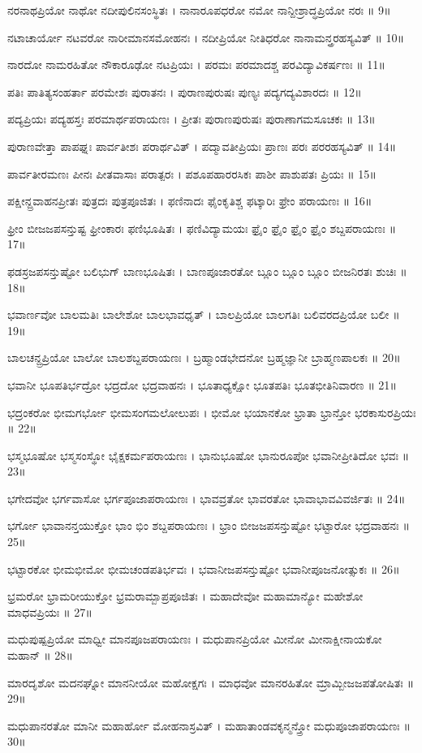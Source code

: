 ನರನಾಥಪ್ರಿಯೋ ನಾಥೋ ನದೀಪುಲಿನಸಂಸ್ಥಿತಃ ।
ನಾನಾರೂಪಧರೋ ನಮೋ ನಾನ್ದೀಶ್ರಾದ್ಧಪ್ರಿಯೋ ನರಃ ॥ 9॥

ನಟಾಚಾರ್ಯೋ ನಟವರೋ ನಾರೀಮಾನಸಮೋಹನಃ ।
ನದೀಪ್ರಿಯೋ ನೀತಿಧರೋ ನಾನಾಮನ್ತ್ರರಹಸ್ಯವಿತ್ ॥ 10॥

ನಾರದೋ ನಾಮರಹಿತೋ ನೌಕಾರೂಢೋ ನಟಪ್ರಿಯಃ ।
ಪರಮಃ ಪರಮಾದಶ್ಚ ಪರವಿದ್ಯಾವಿಕರ್ಷಣಃ ॥ 11॥

ಪತಿಃ ಪಾತಿತ್ಯಸಂಹರ್ತಾ ಪರಮೇಶಃ ಪುರಾತನಃ ।
ಪುರಾಣಪುರುಷಃ ಪುಣ್ಯಃ ಪದ್ಯಗದ್ಯವಿಶಾರದಃ ॥ 12॥

ಪದ್ಯಪ್ರಿಯಃ ಪದ್ಯಹಸ್ತಃ ಪರಮಾರ್ಥಪರಾಯಣಃ ।
ಪ್ರೀತಃ ಪುರಾಣಪುರುಷಃ ಪುರಾಣಾಗಮಸೂಚಕಃ ॥ 13॥

ಪುರಾಣವೇತ್ತಾ ಪಾಪಘ್ನಃ ಪಾರ್ವತೀಶಃ ಪರಾರ್ಥವಿತ್ ।
ಪದ್ಮಾವತೀಪ್ರಿಯಃ ಪ್ರಾಣಃ ಪರಃ ಪರರಹಸ್ಯವಿತ್ ॥ 14॥

ಪಾರ್ವತೀರಮಣಃ ಪೀನಃ ಪೀತವಾಸಾಃ ಪರಾತ್ಪರಃ ।
ಪಶೂಪಹಾರರಸಿಕಃ ಪಾಶೀ ಪಾಶುಪತಃ ಪ್ರಿಯಃ ॥ 15॥

ಪಕ್ಷೀನ್ದ್ರವಾಹನಪ್ರೀತಃ ಪುತ್ರದಃ ಪುತ್ರಪೂಜಿತಃ ।
ಫಣಿನಾದಃ ಫೈಂಕೃತಿಶ್ಚ ಫಟ್ಕಾರಿಃ ಫ್ರೇಂ ಪರಾಯಣಃ ॥ 16॥

ಫ್ರೀಂ ಬೀಜಜಪಸನ್ತುಷ್ಟ ಫ್ರೀಂಕಾರಃ ಫಣಿಭೂಷಿತಃ ।
ಫಣಿವಿದ್ಯಾಮಯಃ ಫ್ರೈಂ ಫ್ರೈಂ ಫ್ರೈಂ ಫ್ರೈಂ ಶಬ್ದಪರಾಯಣಃ ॥ 17॥

ಫಡಸ್ರಜಪಸನ್ತುಷ್ಟೋ ಬಲಿಭುಗ್ ಬಾಣಭೂಷಿತಃ ।
ಬಾಣಪೂಜಾರತೋ ಬ್ಲೂಂ ಬ್ಲೂಂ ಬ್ಲೂಂ ಬೀಜನಿರತಃ ಶುಚಿಃ ॥ 18॥

ಭವಾರ್ಣವೋ ಬಾಲಮತಿಃ ಬಾಲೇಶೋ ಬಾಲಭಾವಧೃತ್  ।
ಬಾಲಪ್ರಿಯೋ ಬಾಲಗತಿಃ ಬಲಿವರದಪ್ರಿಯೋ ಬಲೀ ॥ 19॥

ಬಾಲಚನ್ದ್ರಪ್ರಿಯೋ ಬಾಲೋ ಬಾಲಶಬ್ದಪರಾಯಣಃ ।
ಬ್ರಹ್ಮಾಂಡಭೇದನೋ ಬ್ರಹ್ಮಜ್ಞಾನೀ ಬ್ರಾಹ್ಮಣಪಾಲಕಃ ॥ 20॥

ಭವಾನೀ ಭೂಪತಿರ್ಭದ್ರೋ ಭದ್ರದೋ ಭದ್ರವಾಹನಃ ।
ಭೂತಾಧ್ಯಕ್ಷೋ ಭೂತಪತಿಃ ಭೂತಭೀತಿನಿವಾರಣ ॥ 21॥

ಭದ್ರಂಕರೋ ಭೀಮಗರ್ಭೋ ಭೀಮಸಂಗಮಲೋಲುಪಃ ।
ಭೀಮೋ ಭಯಾನಕೋ ಭ್ರಾತಾ ಭ್ರಾನ್ತೋ ಭರಕಾಸುರಪ್ರಿಯಃ ॥ 22॥

ಭಸ್ಮಭೂಷೋ ಭಸ್ಮಸಂಸ್ಥೋ ಭೈಕ್ಷಕರ್ಮಪರಾಯಣಃ ।
ಭಾನುಭೂಷೋ ಭಾನುರೂಪೋ ಭವಾನೀಪ್ರೀತಿದೋ ಭವಃ ॥ 23॥

ಭಗೇದವೋ ಭರ್ಗವಾಸೋ ಭರ್ಗಪೂಜಾಪರಾಯಣಃ ।
ಭಾವವ್ರತೋ ಭಾವರತೋ ಭಾವಾಭಾವವಿವರ್ಜಿತಃ ॥ 24॥

ಭರ್ಗೋ ಭಾವಾನನ್ತಯುಕ್ತೋ ಭಾಂ ಭಿಂ ಶಬ್ದಪರಾಯಣಃ ।
ಭ್ರಾಂ ಬೀಜಜಪಸನ್ತುಷ್ಟೋ ಭಟ್ಟಾರೋ ಭದ್ರವಾಹನಃ ॥ 25॥

ಭಟ್ಟಾರಕೋ ಭೀಮಭೀಮೋ ಭೀಮಚಂಡಪತಿರ್ಭವಃ ।
ಭವಾನೀಜಪಸನ್ತುಷ್ಟೋ ಭವಾನೀಪೂಜನೋತ್ಸುಕಃ ॥ 26॥

ಭ್ರಮರೋ ಭ್ರಾಮರೀಯುಕ್ತೋ ಭ್ರಮರಾಮ್ಬಾಪ್ರಪೂಜಿತಃ ।
ಮಹಾದೇವೋ ಮಹಾಮಾನ್ಯೋ ಮಹೇಶೋ ಮಾಧವಪ್ರಿಯಃ ॥ 27॥

ಮಧುಪುಷ್ಪಪ್ರಿಯೋ ಮಾಧ್ವೀ ಮಾನಪೂಜಪರಾಯಣಃ ।
ಮಧುಪಾನಪ್ರಿಯೋ ಮೀನೋ ಮೀನಾಕ್ಷೀನಾಯಕೋ ಮಹಾನ್ ॥ 28॥

ಮಾರದೃಶೋ ಮದನಘ್ನೋ ಮಾನನೀಯೋ ಮಹೋಕ್ಷಗಃ ।
ಮಾಧವೋ ಮಾನರಹಿತೋ ಮ್ರಾಮ್ಬೀಜಜಪತೋಷಿತಃ ॥ 29॥

ಮಧುಪಾನರತೋ ಮಾನೀ ಮಹಾರ್ಹೋ ಮೋಹನಾಸ್ರವಿತ್ ।
ಮಹಾತಾಂಡವಕೃನ್ಮನ್ತ್ರೋ ಮಧುಪೂಜಾಪರಾಯಣಃ ॥ 30॥

